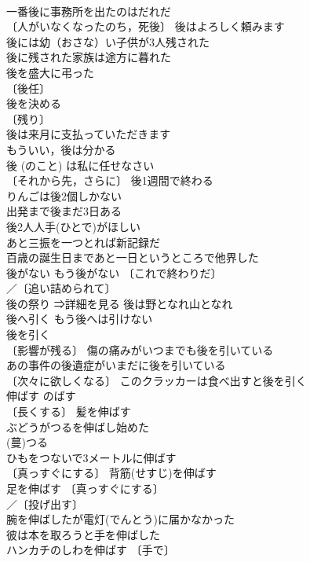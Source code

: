 \documentclass[8pt]{extreport}
\begin{document}
\begin{CJK}{UTF8}{min}
\\	一番後に事務所を出たのはだれだ 
\\	〔人がいなくなったのち，死後〕 後はよろしく頼みます 
\\	後には幼（おさな）い子供が3人残された 
\\	後に残された家族は途方に暮れた 
\\	後を盛大に弔った 
\\	〔後任〕
\\	後を決める 
\\	〔残り〕
\\	後は来月に支払っていただきます 
\\	もういい，後は分かる 
\\	後 (のこと) は私に任せなさい 
\\	〔それから先，さらに〕 後1週間で終わる 
\\	りんごは後2個しかない 
\\	出発まで後まだ3日ある 
\\	後2人人手(ひとで)がほしい 
\\	あと三振を一つとれば新記録だ 
\\	百歳の誕生日まであと一日というところで他界した 
\\	後がない もう後がない 〔これで終わりだ〕
\\	／〔追い詰められて〕
\\	後の祭り ⇒詳細を見る 後は野となれ山となれ 
\\	後へ引く もう後へは引けない 
\\	後を引く 
\\	〔影響が残る〕 傷の痛みがいつまでも後を引いている 
\\	あの事件の後遺症がいまだに後を引いている 
\\	〔次々に欲しくなる〕 このクラッカーは食べ出すと後を引く 
\\	伸ばす	のばす	
\\	〔長くする〕 髪を伸ばす 
\\	ぶどうがつるを伸ばし始めた 
\\	(蔓)つる 
\\	ひもをつないで3メートルに伸ばす 
\\	〔真っすぐにする〕 背筋(せすじ)を伸ばす 
\\	足を伸ばす 〔真っすぐにする〕
\\	／〔投げ出す〕
\\	腕を伸ばしたが電灯(でんとう)に届かなかった 
\\	彼は本を取ろうと手を伸ばした 
\\	ハンカチのしわを伸ばす 〔手で〕

\end{CJK}
\end{document}
